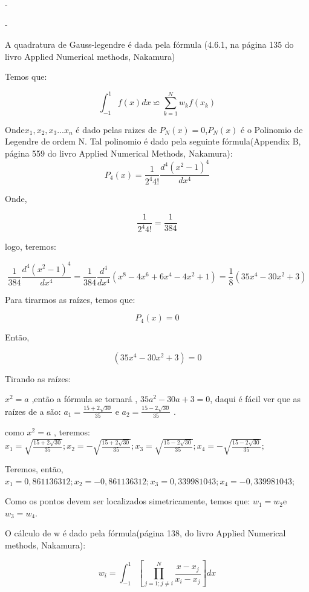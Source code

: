 \begin{enumerate}
\begin{example}
-

-

A quadratura de Gauss-legendre é dada pela fórmula (4.6.1, na página
135 do livro Applied Numerical methods, Nakamura)

Temos que:

\emph{\[
\int_{-1}^{1}{\scriptstyle f(x)dx}\backsimeq\sum_{{\scriptstyle {\scriptscriptstyle k=1}}}^{{\scriptscriptstyle N}}{\scriptstyle w_{k}f(x_{k})}\]
}

Onde$x_{1},x_{2},x_{3}...x_{n}$ é dado pelas raizes de $P_{N}(x)=0$,$P_{N}(x)$
é o Polinomio de Legendre de ordem N. Tal polinomio é dado pela seguinte
fórmula(Appendix B, página 559 do livro Applied Numerical Methods,
Nakamura): \[
P_{4}(x)=\frac{1}{2^{4}4!}\frac{d^{4}(x^{2}-1)^{4}}{dx^{4}}\]


Onde, 

\[
\frac{1}{2^{4}4!}=\frac{1}{384}\]


logo, teremos:

\[
\frac{1}{384}\frac{d^{4}(x^{2}-1)^{4}}{dx^{4}}=\frac{1}{384}\frac{d^{4}}{dx^{4}}(x^{8}-4x^{6}+6x^{4}-4x^{2}+1)=\frac{1}{8}(35x^{4}-30x^{2}+3)\]


Para tirarmos as raízes, temos que:

\[
P_{4}(x)=0\]


Então,

\[
(35x^{4}-30x^{2}+3)=0\]


Tirando as raízes:


$x^{2}=a$ ,então a fórmula se tornará , $35a^{2}-30a+3=0$, daqui
é fácil ver que as raízes de a são: $a_{1}=\frac{15+2\sqrt{30}}{35}$
e $a_{2}=\frac{15-2\sqrt{30}}{35}$ .

como $x^{2}=a$ , teremos: $x_{1}=\sqrt{\frac{15+2\sqrt{30}}{35}};x_{2}=-\sqrt{\frac{15+2\sqrt{30}}{35}};x_{3}=\sqrt{\frac{15-2\sqrt{30}}{35}};x_{4}=-\sqrt{\frac{15-2\sqrt{30}}{35}};$

Teremos, então, $x_{1}=0,861136312;x_{2}=-0,861136312;x_{3}=0,339981043;x_{4}=-0,339981043;$


Como os pontos devem ser localizados simetricamente, temos que: $w_{1}=w_{2}$e$w_{3}=w_{4}.$

O cálculo de w é dado pela fórmula(página 138, do livro Applied Numerical
methods, Nakamura):

\[
w_{i}=\int_{-1}^{1}\left[\prod_{{\scriptscriptstyle j=1;j\neq i}}^{{\scriptscriptstyle N}}{\scriptstyle \frac{{\scriptstyle x-x_{j}}}{x_{i}-x_{j}}}\right]dx\]



\end{example}
\end{enumerate}
